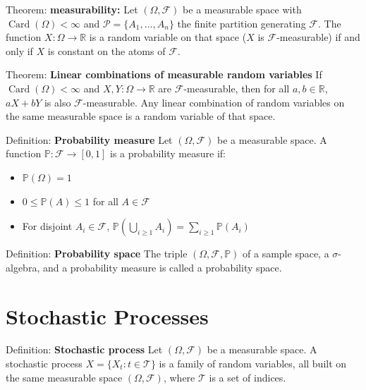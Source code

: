 \documentclass[12pt,a4paper]{article}
\begin{document}
Theorem: \textbf{measurability:} Let $(\Omega, \mathcal{F})$ be a measurable space with $\operatorname{Card}(\Omega) < \infty$ and $\mathcal{P} = \{A_1, \ldots, A_n\}$ the finite partition generating $\mathcal{F}$. The function $X : \Omega \to \mathbb{R}$ is a random variable on that space ($X$ is $\mathcal{F}$-measurable) if and only if $X$ is constant on the atoms of $\mathcal{F}$.
\vspace{1em}


Theorem: \textbf{Linear combinations of measurable random variables}
If $\operatorname{Card}(\Omega) < \infty$ and $X, Y : \Omega \to \mathbb{R}$ are $\mathcal{F}$-measurable, then for all $a, b \in \mathbb{R}$, $aX + bY$ is also $\mathcal{F}$-measurable. Any linear combination of random variables on the same measurable space is a random variable of that space.
\vspace{1em}


Definition: \textbf{Probability measure}
Let $(\Omega, \mathcal{F})$ be a measurable space. A function $\mathbb{P} : \mathcal{F} \to [0,1]$ is a probability measure if:
\begin{itemize}
	\item[P1:] $\mathbb{P}(\Omega) = 1$
	\item[P2:] $0 \leq \mathbb{P}(A) \leq 1$ for all $A \in \mathcal{F}$
	\item[P3:] For disjoint $A_i \in \mathcal{F}$, $\mathbb{P}(\bigcup_{i \geq 1} A_i) = \sum_{i \geq 1} \mathbb{P}(A_i)$
\end{itemize}
\vspace{1em}

Definition: \textbf{Probability space}
The triple $(\Omega, \mathcal{F}, \mathbb{P})$ of a sample space, a $\sigma$-algebra, and a probability measure is called a probability space.
\vspace{1em}




\section{Stochastic Processes}

Definition: \textbf{Stochastic process}
\vspace{0.5em}
Let $(\Omega, \mathcal{F})$ be a measurable space. A stochastic process $X = \{X_t : t \in \mathcal{T}\}$ is a family of random variables, all built on the same measurable space $(\Omega, \mathcal{F})$, where $\mathcal{T}$ is a set of indices.
\vspace{1em}
\end{document}
